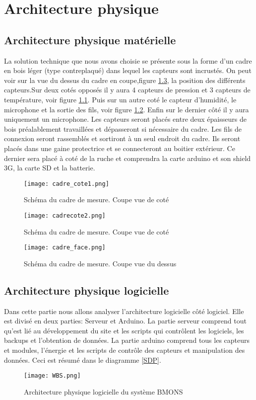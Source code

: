 
\chapter{Architecture physique}

\section{Architecture physique matérielle}
\vspace{1.5cm}
La solution technique que nous avons choisie se présente sous la forme d'un cadre en bois léger (type contreplaqué) dans lequel les capteurs sont incrustés. On peut voir sur la vue du dessus du cadre en coupe,figure \ref{fig:face}, la position des différents capteurs.Sur deux cotés opposés il y aura 4 capteurs de pression et 3 capteurs de température, voir figure \ref{fig:cote1}. Puis sur un autre coté le capteur d'humidité, le microphone et la sortie des fils, voir figure \ref{fig:cote2}. Enfin sur le dernier côté il y aura uniquement un microphone. Les capteurs seront placés entre deux épaisseurs de bois préalablement travaillées et dépasseront si nécessaire du cadre. Les fils de connexion seront rassemblés et sortiront à un seul endroit du cadre. Ils seront placés dans une gaine protectrice et se connecteront au boitier extérieur. Ce dernier sera placé à coté de la ruche et comprendra la carte arduino et son shield 3G, la carte SD et la batterie. 

\begin{figure}[h!]
\centering\texttt{[image: cadre\_cote1.png]}
\caption{\label{fig:cote1} Schéma du cadre de mesure. Coupe vue de coté}
\end{figure}

\begin{figure}[h!]
\centering\texttt{[image: cadrecote2.png]}
\caption{\label{fig:cote2} Schéma du cadre de mesure. Coupe vue de coté}
\end{figure}

\begin{figure}[h!]
\centering\texttt{[image: cadre\_face.png]}
\caption{\label{fig:face} Schéma du cadre de mesure. Coupe vue du dessus}
\end{figure}


\clearpage

\section{Architecture physique logicielle}
\vspace{1.5cm}
Dans cette partie nous allons analyser l'architecture logicielle côté logiciel. Elle est divisé en deux parties: Serveur et Arduino. La partie serveur comprend tout qu'est lié au développement du site et les scripts qui contrôlent les logiciels, les backups et l'obtention de données. La partie arduino comprend tous les capteurs et modules, l'énergie et les scripts de contrôle des capteurs et manipulation des données. Ceci est résumé dans le diagramme \ref{SDP}. 


\begin{figure}[h!]
\centering\texttt{[image: WBS.png]}
\caption{\label{fig:SDP} Architecture physique logicielle du système BMONS}
\end{figure}

\clearpage